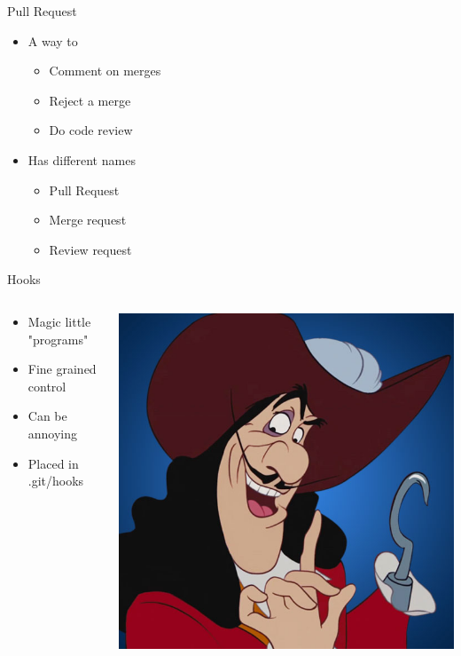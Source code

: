 \documentclass[table,svgnames,aspectratio=169]{beamer}
\begin{document}
\begin{frame}[label={sec:org0abef3e}]{Pull Request}
\begin{itemize}
\item A way to
\begin{itemize}
\item Comment on merges
\item Reject a merge
\item Do code review
\end{itemize}
\item Has different names
\begin{itemize}
\item Pull Request
\item Merge request
\item Review request
\end{itemize}
\end{itemize}
\end{frame}

\begin{frame}[label={sec:orgcca262e}]{Hooks}
\begin{columns}
\begin{column}{.5\columnwidth}
\begin{itemize}
\item Magic little "programs"
\item Fine grained control
\item Can be annoying
\item Placed in .git/hooks
\end{itemize}
\end{column}

\begin{column}{.5\columnwidth}
\begin{center}
\includegraphics[width=.5\textwidth]{graphics/hook.jpg}
\end{center}
\end{column}
\end{columns}
\end{frame}
\end{document}
